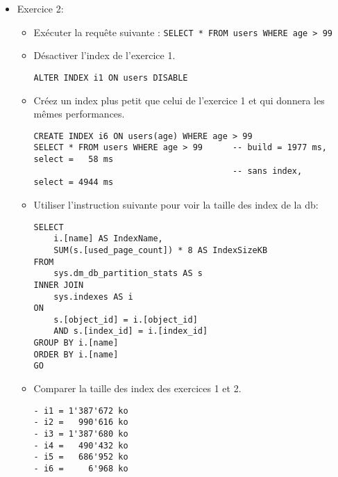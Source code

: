 \documentclass[a4paper]{article}
\begin{document}
\begin{itemize}
\item Exercice 2:
\begin{itemize}
\item Exécuter la requête suivante : \texttt{SELECT * FROM users WHERE age > 99}
\item Désactiver l'index de l'exercice 1.
\begin{example} \begin{verbatim}
ALTER INDEX i1 ON users DISABLE
\end{verbatim} \end{example}
\item Créez un index plus petit que celui de l'exercice 1 et qui donnera les mêmes performances.
\begin{example} \begin{verbatim}
CREATE INDEX i6 ON users(age) WHERE age > 99
SELECT * FROM users WHERE age > 99      -- build = 1977 ms, select =   58 ms
                                        -- sans index,      select = 4944 ms
\end{verbatim} \end{example}
\item Utiliser l'instruction suivante pour voir la taille des index de la db:
\begin{verbatim}
SELECT
    i.[name] AS IndexName,
    SUM(s.[used_page_count]) * 8 AS IndexSizeKB
FROM
    sys.dm_db_partition_stats AS s
INNER JOIN
    sys.indexes AS i
ON
    s.[object_id] = i.[object_id]
    AND s.[index_id] = i.[index_id]
GROUP BY i.[name]
ORDER BY i.[name]
GO
\end{verbatim}
\item Comparer la taille des index des exercices 1 et 2.
\begin{example} \begin{verbatim}
- i1 = 1'387'672 ko
- i2 =   990'616 ko
- i3 = 1'387'680 ko
- i4 =   490'432 ko
- i5 =   686'952 ko
- i6 =     6'968 ko
\end{verbatim} \end{example}
\end{itemize}




\end{itemize}
\end{document}
